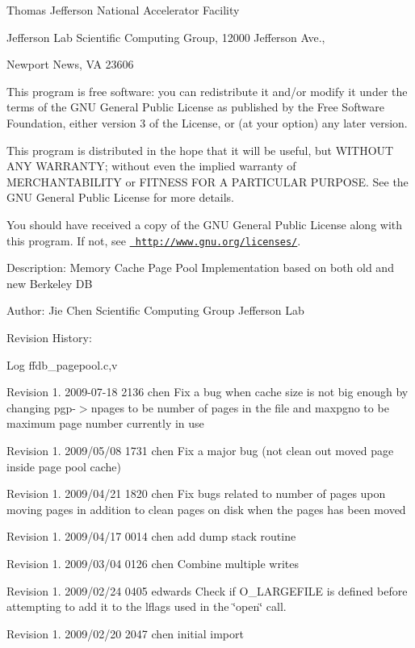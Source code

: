 Thomas Jefferson National Accelerator Facility

Jefferson Lab Scientific Computing Group, 12000 Jefferson Ave.,

Newport News, VA 23606

This program is free software\+: you can redistribute it and/or modify it under the terms of the G\+NU General Public License as published by the Free Software Foundation, either version 3 of the License, or (at your option) any later version.

This program is distributed in the hope that it will be useful, but W\+I\+T\+H\+O\+UT A\+NY W\+A\+R\+R\+A\+N\+TY; without even the implied warranty of M\+E\+R\+C\+H\+A\+N\+T\+A\+B\+I\+L\+I\+TY or F\+I\+T\+N\+E\+SS F\+OR A P\+A\+R\+T\+I\+C\+U\+L\+AR P\+U\+R\+P\+O\+SE. See the G\+NU General Public License for more details.

You should have received a copy of the G\+NU General Public License along with this program. If not, see \href{http://www.gnu.org/licenses/}{\texttt{ http\+://www.\+gnu.\+org/licenses/}}. 

 Description\+: Memory Cache Page Pool Implementation based on both old and new Berkeley DB

Author\+: Jie Chen Scientific Computing Group Jefferson Lab

Revision History\+: \begin{DoxyParagraph}{Log}
ffdb\+\_\+pagepool.\+c,v 
\end{DoxyParagraph}
Revision 1. 2009-\/07-\/18 2136 chen Fix a bug when cache size is not big enough by changing pgp-\/$>$npages to be number of pages in the file and maxpgno to be maximum page number currently in use

Revision 1. 2009/05/08 1731 chen Fix a major bug (not clean out moved page inside page pool cache)

Revision 1. 2009/04/21 1820 chen Fix bugs related to number of pages upon moving pages in addition to clean pages on disk when the pages has been moved

Revision 1. 2009/04/17 0014 chen add dump stack routine

Revision 1. 2009/03/04 0126 chen Combine multiple writes

Revision 1. 2009/02/24 0405 edwards Check if O\+\_\+\+L\+A\+R\+G\+E\+F\+I\+LE is defined before attempting to add it to the lflags used in the \char`\"{}open\char`\"{} call.

Revision 1. 2009/02/20 2047 chen initial import \mbox{\label{adat-devel_2other__libs_2filedb_2filehash_2ffdb__pagepool_8c_a55eb99244f26f6a99486bb00c529d6d1}} 
